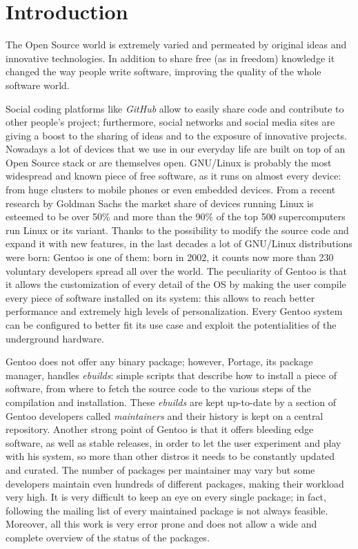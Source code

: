 \chapter{Introduction}

The Open Source world is extremely varied and permeated by original ideas and innovative technologies. In addition to share free (as in freedom) knowledge it changed the way people write software, improving the quality of the whole software world.

Social coding platforms like \emph{GitHub} allow to easily share code and contribute to other people's project; furthermore, social networks and social media sites are giving a boost to the sharing of ideas and to the exposure of innovative projects.
Nowadays a lot of devices that we use in our everyday life are built on top of an Open Source stack or are themselves open. GNU/Linux is probably the most widespread and known piece of free software, as it runs on almost every device: from huge clusters to mobile phones or even embedded devices. From a recent research by Goldman Sachs the market share of devices running Linux is esteemed to be over 50\%\cite{goldmansachs_microsoft} and more than the 90\% of the top 500 supercomputers run Linux or its variant\cite{top500}.
Thanks to the possibility to modify the source code and expand it with new features, in the last decades a lot of GNU/Linux distributions were born: Gentoo is one of them: born in 2002, it counts now more than 230 voluntary developers spread all over the world. The peculiarity of Gentoo is that it allows the customization of every detail of the OS by making the user compile every piece of software installed on its system: this allows to reach better performance and extremely high levels of personalization. Every Gentoo system can be configured to better fit its use case and exploit the potentialities of the underground hardware.

Gentoo does not offer any binary package; however, Portage, its package manager, handles \emph{ebuilds}: simple scripts that describe how to install a piece of software, from where to fetch the source code to the various steps of the compilation and installation. These \emph{ebuilds} are kept up-to-date by a section of Gentoo developers called \emph{maintainers} and their history is kept on a central repository. Another strong point of Gentoo is that it offers bleeding edge software, as well as stable releases, in order to let the user experiment and play with his system, so more than other distros it needs to be constantly updated and curated.
The number of packages per maintainer may vary but some developers maintain even hundreds of different packages, making their workload very high. It is very difficult to keep an eye on every single package; in fact, following the mailing list of every maintained package is not always feasible. Moreover, all this work is very error prone and does not allow a wide and complete overview of the status of the packages.

